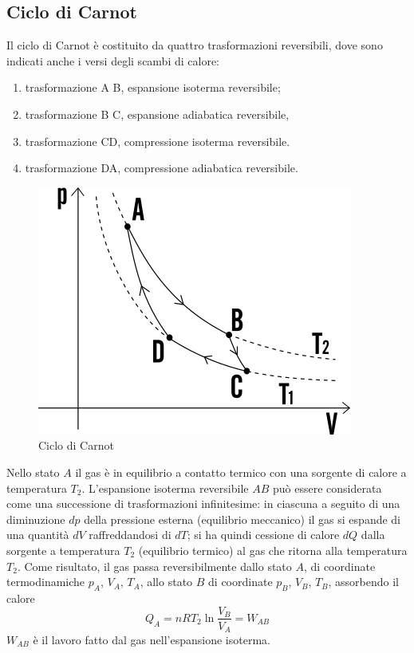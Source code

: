 \documentclass[class=book, crop=false, oneside, 12pt]{standalone}
\begin{document}
\subsection{Ciclo di Carnot}

Il ciclo di Carnot è costituito da quattro trasformazioni reversibili, dove sono indicati anche i versi degli scambi di calore: 

\begin{enumerate}
    \item trasformazione A B, espansione isoterma reversibile;
    \item trasformazione B C, espansione adiabatica reversibile,
    \item trasformazione CD, compressione isoterma reversibile.
    \item trasformazione DA, compressione adiabatica reversibile.
\end{enumerate}

\begin{figure}[h]
    \includegraphics[scale=0.4]{ciclo-di-carnot}
    \centering
    \caption{Ciclo di Carnot}
\end{figure}

Nello stato \(A\) il gas è in equilibrio a contatto termico con una sorgente di calore a temperatura \(T_2\).
L'espansione isoterma reversibile \(AB\) può essere considerata come una successione di trasformazioni infinitesime: in ciascuna a seguito di una diminuzione \(dp\) della pressione esterna (equilibrio meccanico) il gas si espande di una quantità \(d V\) raffreddandosi di \(d T\); si ha quindi cessione di calore \(d Q\) dalla sorgente a temperatura \(T_2\) (equilibrio termico) al gas che ritorna alla temperatura \(T_2\). 
Come risultato, il gas passa reversibilmente dallo stato \(A\), di coordinate termodinamiche \(p_A\), \(V_A\), \(T_A\), allo stato \(B\) di coordinate \(p_B\), \(V_B\), \(T_B\), assorbendo il calore
\begin{equation*}
    Q_A = n R T_2 \ln \frac{V_B}{V_A} = W_{AB}
\end{equation*}
\(W_{AB}\) è il lavoro fatto dal gas nell'espansione isoterma. 
\end{document}
